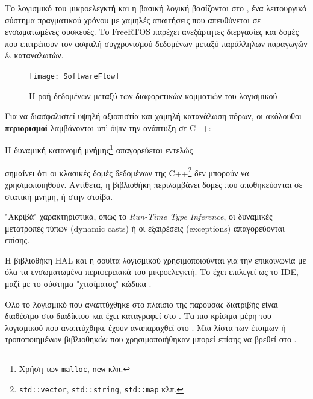 \documentclass[a4paper,nobib]{tufte-book}
\begin{document}
	Το λογισμικό του μικροελεγκτή και η βασική λογική βασίζονται στο \textbf{}, ένα λειτουργικό σύστημα πραγματικού χρόνου με χαμηλές απαιτήσεις που απευθύνεται σε ενσωματωμένες συσκευές. Το FreeRTOS παρέχει ανεξάρτητες διεργασίες και δομές που επιτρέπουν τον ασφαλή συγχρονισμού δεδομένων μεταξύ παράλληλων παραγωγών \& καταναλωτών.
\begin{figure}[h]
	\texttt{[image: SoftwareFlow]}
	\caption{Η ροή δεδομένων μεταξύ των διαφορετικών κομματιών του λογισμικού}
	\label{sec:softwareflow}
\end{figure}

Για να διασφαλιστεί υψηλή αξιοπιστία και χαμηλή κατανάλωση πόρων, οι ακόλουθοι \textbf{περιορισμοί} λαμβάνονται υπ' όψιν την ανάπτυξη σε C++:
\begin{compactenum}
	\item Η δυναμική κατανομή μνήμης\footnote{Χρήση των \texttt{malloc}, \texttt{new} κλπ.} απαγορεύεται εντελώς
	\label{itm:malloc}
	\item {} σημαίνει ότι οι κλασικές δομές δεδομένων της C++\footnote{\texttt{std::vector}, \texttt{std::string}, \texttt{std::map} κλπ.} δεν μπορούν να χρησιμοποιηθούν. Αντίθετα, η βιβλιοθήκη  περιλαμβάνει δομές που αποθηκεύονται σε στατική μνήμη, ή στην στοίβα.
	\item "Ακριβά" χαρακτηριστικά, όπως το \emph{Run-Time Type Inference}, οι δυναμικές μετατροπές τύπων (dynamic casts) ή οι εξαιρέσεις (exceptions) απαγορεύονται επίσης.
\end{compactenum}

Η βιβλιοθήκη \ac{HAL} και η σουίτα λογισμικού   χρησιμοποιούνται για την επικοινωνία με όλα τα ενσωματωμένα περιφερειακά του μικροελεγκτή. Το  έχει επιλεγεί ως το \acs{IDE}, μαζί με το σύστημα "χτισίματος" κώδικα .

Όλο το λογισμικό που αναπτύχθηκε στο πλαίσιο της παρούσας διατριβής είναι διαθέσιμο στο διαδίκτυο και έχει καταγραφεί στο . Τα πιο κρίσιμα μέρη του λογισμικού που αναπτύχθηκε έχουν αναπαραχθεί στο . Μια λίστα των έτοιμων ή τροποποιημένων βιβλιοθηκών που χρησιμοποιήθηκαν μπορεί επίσης να βρεθεί στο .
\end{document}

